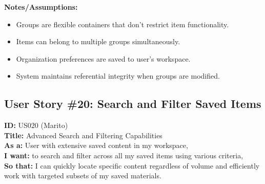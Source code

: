 \documentclass[12pt]{article}
\begin{document}
\vspace{1em}
\textbf{Notes/Assumptions:}
\begin{itemize}
    \item Groups are flexible containers that don't restrict item functionality.
    \item Items can belong to multiple groups simultaneously.
    \item Organization preferences are saved to user's workspace.
    \item System maintains referential integrity when groups are modified.
\end{itemize}


\subsection{User Story \#20: Search and Filter Saved Items}
\textbf{ID:} US020 (Marito) \\
\textbf{Title:} Advanced Search and Filtering Capabilities \\
\textbf{As a:} User with extensive saved content in my workspace, \\
\textbf{I want:} to search and filter across all my saved items using various criteria, \\
\textbf{So that:} I can quickly locate specific content regardless of volume and efficiently work with targeted subsets of my saved materials.
\end{document}
